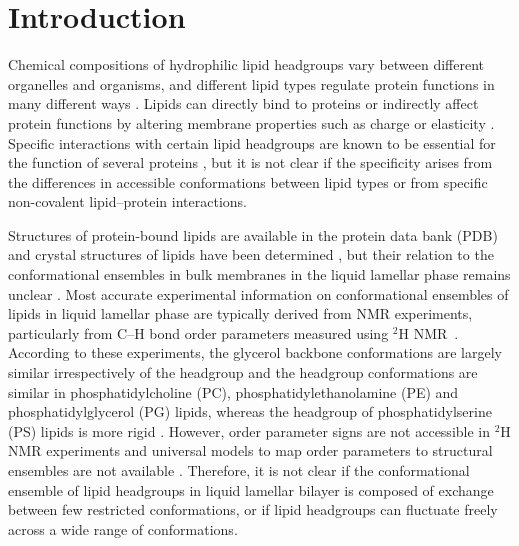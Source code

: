 \documentclass[aps,prl,superscriptaddress,twocolumn]{revtex4}
\begin{document}

\maketitle



\section{Introduction}

Chemical compositions of hydrophilic lipid headgroups vary between different
organelles and organisms, and different lipid types
regulate protein functions in many different ways \cite{lee03,vanmeer08}.
Lipids can directly bind to proteins or indirectly affect protein
functions by altering membrane properties such as charge or elasticity \cite{lee03,lemmon08}.
Specific interactions with certain lipid headgroups
are known to be essential for the function of several proteins \cite{lee11,lemmon08},
but it is not clear if the specificity arises from the
differences in accessible conformations between lipid types or
from specific non-covalent lipid--protein interactions.

Structures of protein-bound lipids are available in the protein data bank (PDB) \cite{berman00}
and crystal structures of lipids have been determined \cite{buldt81,pascher92},
but their relation to the conformational ensembles in bulk membranes in the liquid lamellar phase remains unclear \cite{marsh13b}.
Most accurate experimental information on conformational ensembles of lipids
in liquid lamellar phase are typically derived from NMR experiments, particularly from 
C--H bond order parameters measured using $^2$H NMR~\cite{seelig77c,davis83,Semchyschyn04}.
According to these experiments, the glycerol backbone conformations are largely similar irrespectively of the headgroup \cite{gally81} and
the headgroup conformations are similar in phosphatidylcholine (PC), phosphatidylethanolamine (PE) and phosphatidylglycerol (PG) lipids,
whereas the headgroup of phosphatidylserine (PS) lipids is more rigid \cite{wohlgemuth80,buldt81}. 
However, order parameter signs are not accessible in $^2$H NMR experiments \cite{ollila16}
and universal models to map order parameters to structural ensembles are not available \cite{pezeshkian18,akutsu20}.
Therefore, it is not clear if the conformational ensemble of lipid headgroups in liquid lamellar bilayer
is composed of exchange between few restricted conformations, or if lipid headgroups can fluctuate freely across a wide range of conformations.
\end{document}
